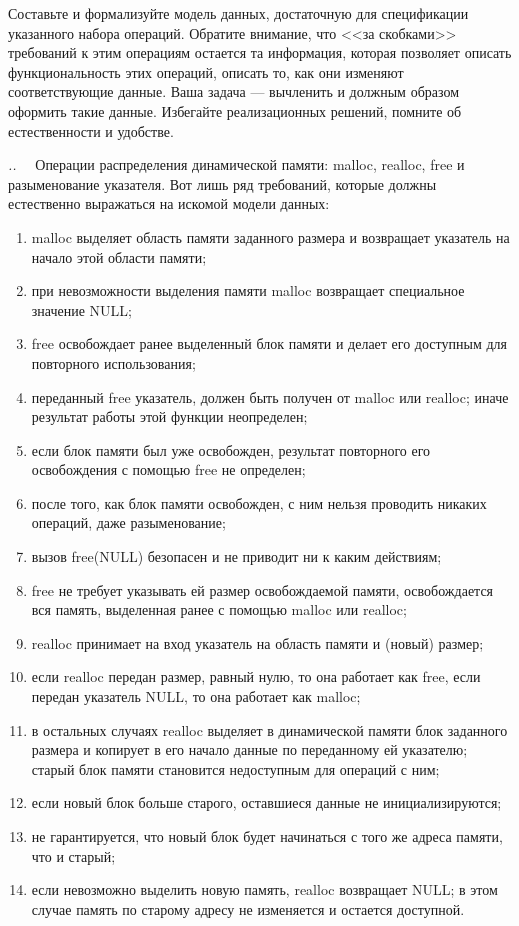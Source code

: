 \documentclass[14pt, twoside]{extreport}
\newcounter{problem_type}[chapter]
\newcounter{zadacha}[problem_type]
\newcommand{\z}{\vspace{0.5cm}\par\addtocounter{zadacha}{1}%
\textit{\arabic{chapter}.\arabic{problem_type}.\arabic{zadacha}}~~  }
\begin{document}
Составьте и формализуйте модель данных, достаточную для спецификации указанного набора операций. Обратите внимание, что <<за скобками>> требований к этим операциям остается та информация, которая позволяет описать функциональность этих операций, описать то, как они изменяют соответствующие данные. Ваша задача --- вычленить и должным образом оформить такие данные. Избегайте реализационных решений, помните об естественности и удобстве.

\z Операции распределения динамической памяти: malloc, realloc, free и разыменование указателя. Вот лишь ряд требований, которые должны естественно выражаться на искомой модели данных:
\begin{enumerate}
  \item malloc выделяет область памяти заданного размера и возвращает указатель на начало этой области памяти;
  \item при невозможности выделения памяти malloc возвращает специальное значение NULL;
  \item free освобождает ранее выделенный блок памяти и делает его доступным для повторного использования;
  \item переданный free указатель, должен быть получен от malloc или realloc; иначе результат работы этой функции неопределен;
  \item если блок памяти был уже освобожден, результат повторного его освобождения с помощью free не определен;
  \item после того, как блок памяти освобожден, с ним нельзя проводить никаких операций, даже разыменование;
  \item вызов free(NULL) безопасен и не приводит ни к каким действиям;
  \item free не требует указывать ей размер освобождаемой памяти, освобождается вся память, выделенная ранее с помощью malloc или realloc;
  \item realloc принимает на вход указатель на область памяти и (новый) размер;
  \item если realloc передан размер, равный нулю, то она работает как free, если передан указатель NULL, то она работает как malloc;
  \item в остальных случаях realloc выделяет в динамической памяти блок заданного размера и копирует в его начало данные по переданному ей указателю; старый блок памяти становится недоступным для операций с ним;
  \item если новый блок больше старого, оставшиеся данные не инициализируются;
  \item не гарантируется, что новый блок будет начинаться с того же адреса памяти, что и старый;
  \item если невозможно выделить новую память, realloc возвращает NULL; в этом случае память по старому адресу не изменяется и остается доступной.
\end{enumerate}
\end{document}
